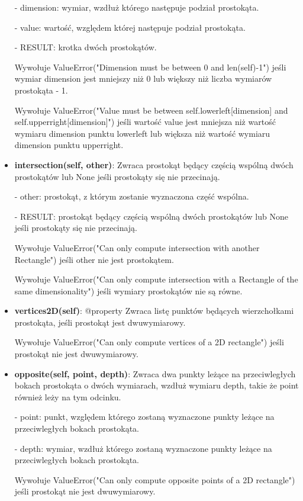 \documentclass{lab}
\begin{document}
\begin{itemize}
  - dimension: wymiar, wzdłuż którego następuje podział prostokąta.

  - value: wartość, względem której następuje podział prostokąta.

  - RESULT: krotka dwóch prostokątów.

  Wywołuje ValueError("Dimension must be between 0 and {len(self)-1}") jeśli wymiar dimension jest mniejszy niż 0 lub większy niż liczba wymiarów prostokąta - 1.

  Wywołuje ValueError("Value must be between {self.lowerleft[dimension]} and {self.upperright[dimension]}") jeśli wartość value jest mniejsza niż wartość wymiaru dimension punktu lowerleft lub większa niż wartość wymiaru dimension punktu upperright.

  \item \textbf{intersection(self, other)}:
  Zwraca prostokąt będący częścią wspólną dwóch prostokątów lub None jeśli prostokąty się nie przecinają.

  - other: prostokąt, z którym zostanie wyznaczona część wspólna.

  - RESULT: prostokąt będący częścią wspólną dwóch prostokątów lub None jeśli prostokąty się nie przecinają.

  Wywołuje ValueError("Can only compute intersection with another Rectangle") jeśli other nie jest prostokątem.

  Wywołuje ValueError("Can only compute intersection with a Rectangle of the same dimensionality") jeśli wymiary prostokątów nie są równe.

  \item \textbf{vertices2D(self)}:
  @property Zwraca listę punktów będących wierzchołkami prostokąta, jeśli prostokąt jest dwuwymiarowy.

  Wywołuje ValueError("Can only compute vertices of a 2D rectangle") jeśli prostokąt nie jest dwuwymiarowy.

  \item \textbf{opposite(self, point, depth)}:
  Zwraca dwa punkty leżące na przeciwległych bokach prostokąta o dwóch wymiarach, wzdłuż wymiaru depth, takie że point również leży na tym odcinku.

  - point: punkt, względem którego zostaną wyznaczone punkty leżące na przeciwległych bokach prostokąta.

  - depth: wymiar, wzdłuż którego zostaną wyznaczone punkty leżące na przeciwległych bokach prostokąta.

  Wywołuje ValueError("Can only compute opposite points of a 2D rectangle") jeśli prostokąt nie jest dwuwymiarowy. 


\end{itemize}
\end{document}
